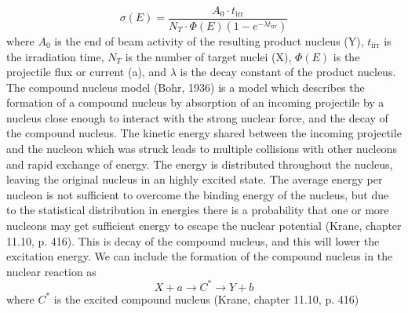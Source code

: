 \documentclass[a4paper,11pt,twoside]{book}
\begin{document}
\begin{equation}
    \sigma(E) = \frac{A_0 \cdot t_\text{irr}}{N_T \cdot \Phi(E)(1-e^{-\lambda t_\text{irr}})}
\end{equation}
\noindent where $A_0$ is the end of beam activity of the resulting product nucleus (Y), $t_\text{irr}$ is the irradiation time, $N_T$ is the number of target nuclei (X), $\Phi(E)$ is the projectile flux or current (a), and $\lambda$ is the decay constant of the product nucleus. \\ 


\noindent The compound nucleus model (Bohr, 1936) is a model which describes the formation of a compound nucleus by absorption of an incoming projectile by a nucleus close enough to interact with the strong nuclear force, and the decay of the compound nucleus. The kinetic energy shared between the incoming projectile and the nucleon which was struck leads to multiple collisions with other nucleons and rapid exchange of energy. The energy is distributed throughout the nucleus, leaving the original nucleus in an highly excited state. The average energy per nucleon is not sufficient to overcome the binding energy of the nucleus, but due to the statistical distribution in energies there is a probability that one or more nucleons may get sufficient energy to escape the nuclear potential (Krane, chapter 11.10, p. 416). This is decay of the compound nucleus, and this will lower the excitation energy. We can include the formation of the compound nucleus in the nuclear reaction as \begin{equation}
    X + a \rightarrow C^* \rightarrow Y + b
\end{equation} where $C^*$ is the excited compound nucleus (Krane, chapter 11.10, p. 416)  \\
\end{document}
